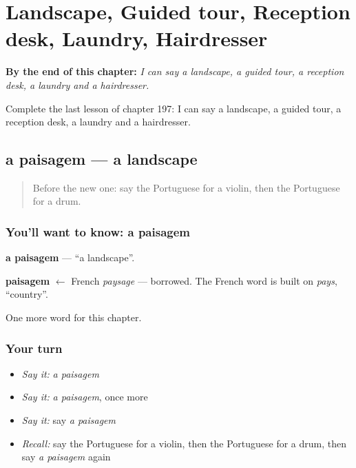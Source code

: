 
\chapter{Landscape, Guided tour, Reception desk, Laundry, Hairdresser}
\label{ch:pt-landscape-guided-tour-reception-desk-laundry-hairdresser}

\begin{chapteropening}
\textbf{By the end of this chapter:} \emph{I can say a landscape, a guided tour, a reception desk, a laundry and a hairdresser.}

Complete the last lesson of chapter 197: I can say a landscape, a guided tour, a reception desk, a laundry and a hairdresser.
\end{chapteropening}

\section[a paisagem]{a paisagem — a landscape}

\label{lesson:PT-C197-paisagem}



\begin{quote}
Before the new one: say the Portuguese for a violin, then the Portuguese for a drum.
\end{quote}

\subsection*{You'll want to know: a paisagem}
\textbf{a paisagem} — \textquotedblleft{}a landscape\textquotedblright{}.

\begin{cousinweb}
\textbf{paisagem} $\leftarrow$ French \emph{paysage} — borrowed. The French word is built on \emph{pays}, \textquotedblleft{}country\textquotedblright{}.
\end{cousinweb}

\begin{grammarlens}[title={What you've built}]
One more word for this chapter.
\end{grammarlens}

\subsection*{Your turn}
\begin{itemize}
\raggedright
  \item \emph{Say it:} \emph{a paisagem}
  \item \emph{Say it:} \emph{a paisagem}, once more
  \item \emph{Say it:} say \emph{a paisagem}
  \item \emph{Recall:} say the Portuguese for a violin, then the Portuguese for a drum, then say \emph{a paisagem} again
\end{itemize}

